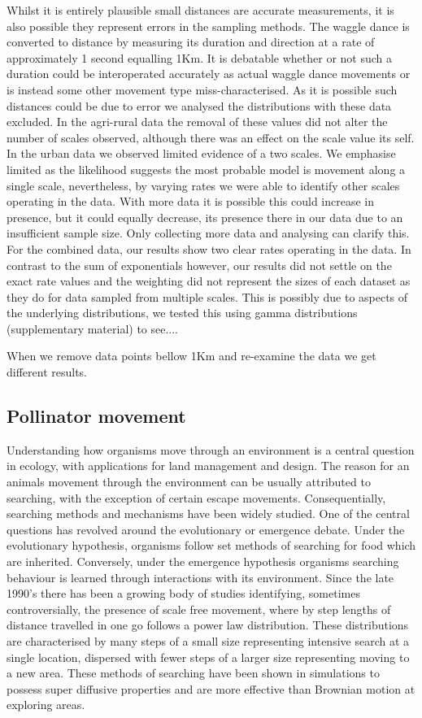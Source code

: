 \documentclass[11pt,usenames,dvipsnames]{article}
\begin{document}
Whilst it is entirely plausible small distances are accurate measurements, it is also possible they represent errors in the sampling methods. The waggle dance is converted to distance by measuring its duration and direction at a rate of approximately 1 second equalling 1Km. It is debatable whether or not such a duration could be interoperated accurately as actual waggle dance movements or is instead some other movement type miss-characterised. As it is possible such distances could be due to error we analysed the distributions with these data excluded. In the agri-rural data the removal of these values did not alter the number of scales observed, although there was an effect on the scale value its self. In the urban data we observed limited evidence of a two scales. We emphasise limited as the likelihood suggests the most probable model is movement along a single scale, nevertheless, by varying rates we were able to identify other scales operating in the data. With more data it is possible this could increase in presence, but it could equally decrease, its presence there in our data due to an insufficient sample size. Only collecting more data and analysing can clarify this. For the combined data, our results show two clear rates operating in the data. In contrast to the sum of exponentials however, our results did not settle on the exact rate values and the weighting did not represent the sizes of each dataset as they do for data sampled from multiple scales. This is possibly due to aspects of the underlying distributions, we tested this using gamma distributions (supplementary material) to see....

When we remove data points bellow 1Km and re-examine the data we get different results.\\

\subsection{Pollinator movement}
Understanding how organisms move through an environment is a central question in ecology, with applications for land management and design. The reason for an animals movement through the environment can be usually attributed to searching, with the exception of certain escape movements. Consequentially, searching methods and mechanisms have been widely studied. One of the central questions has revolved around the evolutionary or emergence debate. Under the evolutionary hypothesis, organisms follow set methods of searching for food which are inherited. Conversely, under the emergence hypothesis organisms searching behaviour is learned through interactions with its environment. Since the late 1990's there has been a growing body of studies identifying, sometimes controversially, the presence of scale free movement, where by step lengths of distance travelled in one go follows a power law distribution. These distributions are characterised by many steps of a small size representing intensive search at a single location, dispersed with fewer steps of a larger size representing moving to a new area. These methods of searching have been shown in simulations to possess super diffusive properties and are more effective than Brownian motion at exploring areas. 
\end{document}
